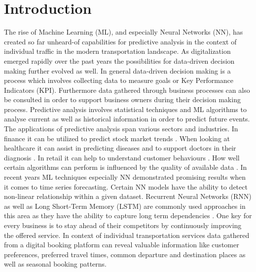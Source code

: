 %
%
% 
% 
% 

\chapter{Introduction}
\label{chap:introduction}
The rise of Machine Learning (ML), and especially Neural Networks (NN), has created so far unheard-of capabilities for predictive analysis in the context of individual traffic in the modern transportation landscape. As digitalization emerged rapidly over the past years the possibilities for data-driven decision making further evolved as well. In general data-driven decision making is a process which involves collecting data to measure goals or Key Performance Indicators (KPI). Furthermore data gathered through business processes can also be consulted in order to support business owners during their decision making process.
\newline
\newline
Predictive analysis involves statistical techniques and ML algorithms to analyse current as well as historical information in order to predict future events. The applications of predictive analysis span various sectors and industries. In finance it can be utilized to predict stock market trends \cite{stock_market}. When looking at healthcare it can assist in predicting diseases and to support doctors in their diagnosis \cite{health_care}. In retail it can help to understand customer behaviours \cite{retail}. How well certain algorithms can perform is influenced by the quality of available data \cite{data_qual}. In recent years ML techniques especially NN demonstrated promising results when it comes to time series forecasting. Certain NN models have the ability to detect non-linear relationship within a given dataset. Recurrent Neural Networks (RNN) as well as Long Short-Term Memory (LSTM) are commonly used approaches in this area as they have the ability to capture long term dependencies \cite{intro_ml_1}.
\newline
\newline
One key for every business is to stay ahead of their competitors by continuously improving the offered service. 
In context of individual transportation services data gathered from a digital booking platform can reveal valuable information like customer preferences, preferred travel times, common departure and destination places as well as seasonal booking patterns.